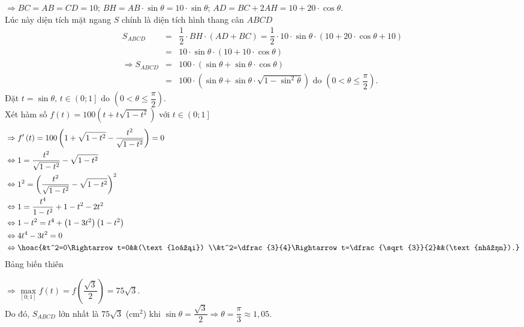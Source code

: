 \begin{ex}
{		$\Rightarrow BC=AB=CD=10$; $BH=AB\cdot\sin \theta =10\cdot\sin \theta$; $AD=BC+2AH=10+20\cdot\cos \theta $.\\
		Lúc này diện tích mặt ngang $S$ chính là diện tích hình thang cân $ABCD$
		\allowdisplaybreaks
		\begin{eqnarray*}
			S_{ABCD}&=&\dfrac{1}{2}\cdot BH\cdot \left(AD+BC\right)=\dfrac{1}{2}\cdot 10\cdot \sin \theta \cdot \left(10+20\cdot \cos \theta +10\right)\\
			&=&10\cdot \sin \theta \cdot \left(10+10\cdot \cos \theta\right)\\
			\Rightarrow {S_{ABCD}}&=&100\cdot \left(\sin \theta +\sin \theta\cdot \cos \theta\right)\\
			&=&100\cdot \left(\sin \theta +\sin \theta\cdot \sqrt{1-\sin^2\theta}\right)\text{ do }\left(0<\theta \le \dfrac{\pi}{2}\right).
		\end{eqnarray*}
		Đặt $t=\sin \theta,\,t\in \left(0;1\right]$ do $\left(0<\theta \le \dfrac{\pi}{2}\right)$.\\
		Xét hàm số $f\left(t\right)=100\left(t+t\sqrt{1-t^2}\right)$ với $t\in \left(0;1\right]$
		$$\begin{aligned}
			& \Rightarrow f'\left(t\right)=100\left(1+\sqrt{1-t^2}-\dfrac{t^2}{\sqrt{1-t^2}}\right)=0 \\
			& \Leftrightarrow 1=\dfrac{t^2}{\sqrt{1-t^2}}-\sqrt{1-t^2} \\
			& \Leftrightarrow{1^2}=\left(\dfrac{t^2}{\sqrt{1-t^2}}-\sqrt{1-t^2}\right)^2 \\
			& \Leftrightarrow 1=\dfrac{t^4}{1-t^2}+1-t^2-2t^2 \\
			& \Leftrightarrow 1-t^2=t^4+\left(1-3t^2\right)\left(1-t^2\right) \\
			& \Leftrightarrow 4t^4-3t^2=0 \\
			& \Leftrightarrow \hoac{&t^2=0\Rightarrow t=0&&(\text{loại}) \\&t^2=\dfrac{3}{4}\Rightarrow t=\dfrac{\sqrt{3}}{2}&&(\text{nhận}).} \\
		\end{aligned}$$
		Bảng biến thiên
		\begin{center}
		\end{center}
		$\Rightarrow \max\limits_{\left[0;1\right]}f\left(t\right)=f\left(\dfrac{\sqrt{3}}{2}\right)=75\sqrt{3}$.\\
		Do đó, $S_{ABCD}$ lớn nhất là $75\sqrt{3}$ (cm$^2$) khi $\sin \theta =\dfrac{\sqrt{3}}{2}\Rightarrow \theta =\dfrac{\pi}{3}\approx 1{,}05$.
	}
\end{ex}


